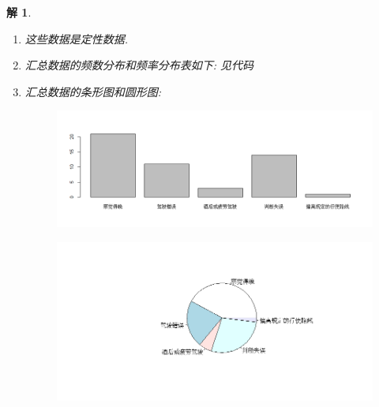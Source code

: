 \documentclass[11pt,a4paper]{ctexart}
\newtheorem*{solution}{解}
\begin{document}
\begin{solution}
\begin{enumerate}
	\item[1.] 这些数据是定性数据.
	\item[2.] 汇总数据的频数分布和频率分布表如下: 见代码
	\item[3.] 汇总数据的条形图和圆形图:

\begin{figure}[H]
	\centering
	\includegraphics[width=\textwidth]{5.png}
\end{figure}
\begin{figure}[H]
	\centering
	\includegraphics[width=\textwidth]{6.png}
\end{figure}


\end{enumerate}
\end{solution}
\end{document}
